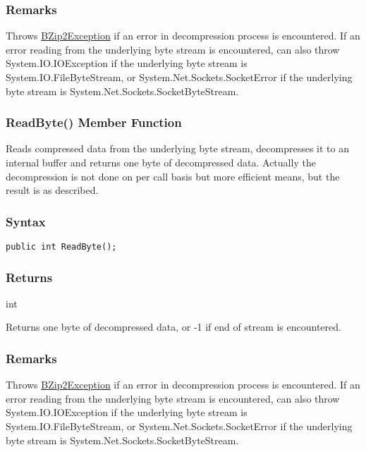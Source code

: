 \documentclass[a4paper,oneside,11.000000pt]{book}
\begin{document}
\subsubsection*{Remarks}
\begin{flushleft}
Throws \hyperlink{System.IO.Compression.BZip2Exception}{BZip2Exception} if an error in decompression process is encountered.
If an error reading from the underlying byte stream is encountered,
can also throw System.\-IO.\-IOException if the underlying byte stream is System.\-IO.\-FileByteStream, or
System.\-Net.\-Sockets.\-SocketError if the underlying byte stream is System.\-Net.\-Sockets.\-SocketByteStream.

\end{flushleft}
\clearpage

\hypertarget{System.IO.Compression.BZip2Stream.ReadByte.P.System.IO.Compression.BZip2Stream}{\subsubsection*{ReadByte() Member Function}}
\begin{flushleft}
Reads compressed data from the underlying byte stream, decompresses it to an internal buffer
and returns one byte of decompressed data.
Actually the decompression is not done on per call basis but more efficient means, but
the result is as described.

\end{flushleft}
\subsubsection*{Syntax}\texttt{public int ReadByte();}
\subsubsection*{Returns}
int
\begin{flushleft}
Returns one byte of decompressed data, or -1 if end of stream is encountered.

\end{flushleft}
\subsubsection*{Remarks}
\begin{flushleft}
Throws \hyperlink{System.IO.Compression.BZip2Exception}{BZip2Exception} if an error in decompression process is encountered.
If an error reading from the underlying byte stream is encountered,
can also throw System.\-IO.\-IOException if the underlying byte stream is System.\-IO.\-FileByteStream, or
System.\-Net.\-Sockets.\-SocketError if the underlying byte stream is System.\-Net.\-Sockets.\-SocketByteStream.

\end{flushleft}
\clearpage
\end{document}

